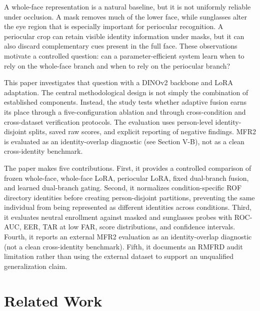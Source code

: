 ﻿\documentclass[10pt,journal,compsoc]{IEEEtran}
\begin{document}
A whole-face representation is a natural baseline, but it is not uniformly reliable under occlusion. A mask removes much of the lower face, while sunglasses alter the eye region that is especially important for periocular recognition. A periocular crop can retain visible identity information under masks, but it can also discard complementary cues present in the full face. These observations motivate a controlled question: can a parameter-efficient system learn when to rely on the whole-face branch and when to rely on the periocular branch?

This paper investigates that question with a DINOv2 backbone and LoRA adaptation. The central methodological design is not simply the combination of established components. Instead, the study tests whether adaptive fusion earns its place through a five-configuration ablation and through cross-condition and cross-dataset verification protocols. The evaluation uses person-level identity-disjoint splits, saved raw scores, and explicit reporting of negative findings. MFR2 is evaluated as an identity-overlap diagnostic (see Section V-B), not as a clean cross-identity benchmark.

The paper makes five contributions. First, it provides a controlled comparison of frozen whole-face, whole-face LoRA, periocular LoRA, fixed dual-branch fusion, and learned dual-branch gating. Second, it normalizes condition-specific ROF directory identities before creating person-disjoint partitions, preventing the same individual from being represented as different identities across conditions. Third, it evaluates neutral enrollment against masked and sunglasses probes with ROC-AUC, EER, TAR at low FAR, score distributions, and confidence intervals. Fourth, it reports an external MFR2 evaluation as an identity-overlap diagnostic (not a clean cross-identity benchmark). Fifth, it documents an RMFRD audit limitation rather than using the external dataset to support an unqualified generalization claim.

\section{Related Work}
\label{sec:related}
\end{document}
